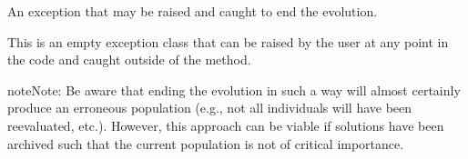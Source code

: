 \documentclass[letterpaper,10pt,english]{sphinxmanual}
\begin{document}

\begin{fulllineitems}
\label{reference:inspyred.ec.EvolutionExit}
An exception that may be raised and caught to end the evolution.

This is an empty exception class that can be raised by the user
at any point in the code and caught outside of the 
method.

\begin{notice}{note}{Note:}
Be aware that ending the evolution in such a way will almost 
certainly produce an erroneous population (e.g., not all 
individuals will have been reevaluated, etc.). However, this 
approach can be viable if solutions have been archived such 
that the current population is not of critical importance.
\end{notice}

\end{fulllineitems}

\end{document}
